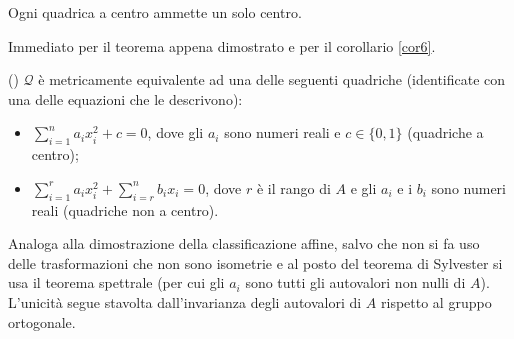 \begin{Corollary}\label{cor7}
	Ogni quadrica a centro ammette un solo centro.
\end{Corollary}
\Proof Immediato per il teorema appena dimostrato e per il corollario \ref{cor6}. \EndProof
\begin{Theorem}\label{th55}
	() $\mathcal{Q}$ \`e metricamente equivalente ad una delle seguenti quadriche (identificate con una delle equazioni che le descrivono):
	\begin{itemize}
		\item $\sum_{i = 1}^n a_ix_i^2 + c = 0$, dove gli $a_i$ sono numeri reali e $c \in \lbrace 0, 1 \rbrace$ (quadriche a centro);
		\item $\sum_{i = 1}^{r} a_ix_i^2 + \sum_{i = r}^n b_ix_i = 0$, dove $r$ \`e il rango di $A$ e gli $a_i$ e i $b_i$ sono numeri reali (quadriche non a centro).
	\end{itemize}
\end{Theorem}
\Proof Analoga alla dimostrazione della classificazione affine, salvo che non si fa uso delle trasformazioni che non sono isometrie e al posto del teorema di Sylvester si usa il teorema spettrale (per cui gli $a_i$ sono tutti gli autovalori non nulli di $A$). L'unicit\`a segue stavolta dall'invarianza degli autovalori di $A$ rispetto al gruppo ortogonale. \EndProof
